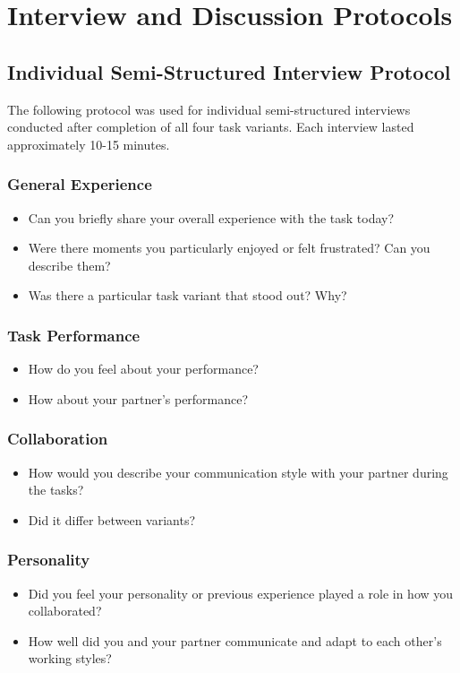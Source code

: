 \section{Interview and Discussion Protocols}

\subsection{Individual Semi-Structured Interview Protocol}
\label{appendix:individual-interview}

The following protocol was used for individual semi-structured interviews conducted after completion of all four task variants. Each interview lasted approximately 10-15 minutes.

\subsubsection{General Experience}
\begin{itemize}
    \item Can you briefly share your overall experience with the task today?
    \item Were there moments you particularly enjoyed or felt frustrated? Can you describe them?
    \item Was there a particular task variant that stood out? Why?
\end{itemize}

\subsubsection{Task Performance}
\begin{itemize}
    \item How do you feel about your performance?
    \item How about your partner's performance?
\end{itemize}

\subsubsection{Collaboration}
\begin{itemize}
    \item How would you describe your communication style with your partner during the tasks?
    \item Did it differ between variants?
\end{itemize}

\subsubsection{Personality}
\begin{itemize}
    \item Did you feel your personality or previous experience played a role in how you collaborated?
    \item How well did you and your partner communicate and adapt to each other's working styles?
\end{itemize}

